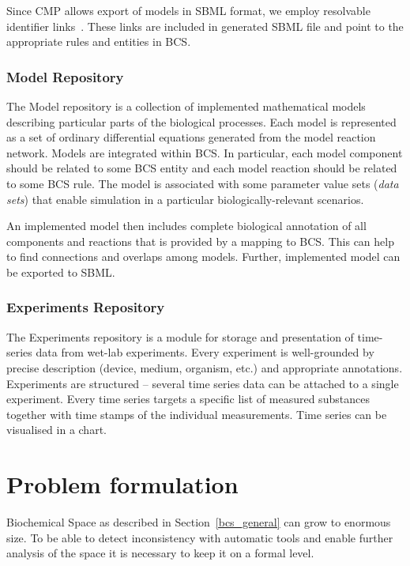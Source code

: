 \documentclass[12pt, twoside]{fithesis2} %
\begin{document}
Since CMP allows export of models in SBML format, we employ resolvable identifier links~\cite{juty2011identifiers}. These links are included in generated SBML file and point to the appropriate rules and entities in BCS.

\subsection{Model Repository}
\label{model}

The Model repository is a collection of implemented mathematical models describing particular parts of the biological processes. Each model is represented as a set of ordinary differential equations generated from the model reaction network. Models are integrated within BCS. In particular, each model component should be related to some BCS entity and each model reaction should be related to some BCS rule. The model is associated with some parameter value sets (\emph{data sets}) that enable simulation in a particular biologically-relevant scenarios.

An implemented model then includes complete biological annotation of all components and reactions that is provided by a mapping to BCS. This can help to find connections and overlaps among models. Further, implemented model can be exported to SBML.

\subsection{Experiments Repository}

The Experiments repository is a module for storage and presentation of time-series data from wet-lab experiments. Every experiment is well-grounded by precise description (device, medium, organism, etc.) and appropriate annotations. Experiments are structured -- several time series data can be attached to a single experiment. Every time series targets a specific list of measured substances together with time stamps of the individual measurements. Time series can be visualised in a chart.	

\chapter{Problem formulation}
\label{problem_formulation}

Biochemical Space as described in Section~\ref{bcs_general} can grow to enormous size. To be able to detect inconsistency with automatic tools and enable further analysis of the space it is necessary to keep it on a formal level.
\end{document}
